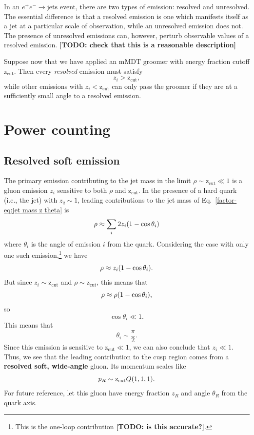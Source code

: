\documentclass[../thesis.tex]{subfiles}
\providecommand{\zcut}{\mathrm{z_{cut}}}
\begin{document}
	In an $e^+ e^- \to \text{jets}$ event, there are two types of emission: resolved and unresolved. The essential difference is that a resolved emission is one which manifests itself as a jet at a particular scale of observation, while an unresolved emission does not. The presence of unresolved emissions can, however, perturb observable values of a resolved emission. {\color{red}\textbf{[TODO: check that this is a reasonable description]}} 

	Suppose now that we have applied an mMDT groomer with energy fraction cutoff $\zcut$. Then every \textit{resolved} emission must satisfy
	\begin{equation}
		z_i > \zcut,
	\end{equation}
	while other emissions with $z_i < \zcut$ can only pass the groomer if they are at a sufficiently small angle to a resolved emission.

\section{Power counting}
\subsection{Resolved soft emission}
	The primary emission contributing to the jet mass in the limit $\rho \sim \zcut \ll 1$ is a gluon emission $z_i$ sensitive to both $\rho$ and $\zcut$. In the presence of a hard quark (i.e., the jet) with $z_q \sim 1$, leading contributions to the jet mass of Eq.~\ref{factor-eq:jet mass z theta} is
	\begin{equation}
		\rho \approx \sum_i 2z_i \qty(1 - \cos\theta_i)
	\end{equation}
	where $\theta_i$ is the angle of emission $i$ from the quark. Considering the case with only one such emission,\footnote{This is the one-loop contribution {\color{red}\textbf{[TODO: is this accurate?]}}.} we have
	\begin{equation}
		\rho \approx z_i \qty(1 - \cos\theta_i).
	\end{equation} 
	But since $z_i \sim \zcut$ and $\rho \sim \zcut$, this means that
	\begin{equation}
		\rho \approx \rho \qty(1 - \cos\theta_i),
	\end{equation}
	so
	\begin{equation}
		\cos\theta_i \ll 1.
	\end{equation}
	This means that
	\begin{equation}
		\theta_i \sim \frac{\pi}{2}.
	\end{equation}
	Since this emission is sensitive to $\zcut \ll 1$, we can also conclude that $z_i \ll 1$. Thus, we see that the leading contribution to the cusp region comes from a \textbf{resolved soft, wide-angle} gluon. Its momentum scales like
	\begin{equation}
		p_R \sim \zcut Q \qty(1, 1, 1).
	\end{equation}
	For future reference, let this gluon have energy fraction $z_R$ and angle $\theta_R$ from the quark axis.
\end{document}
